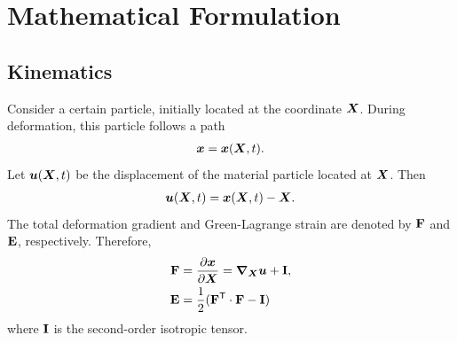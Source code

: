 
\chapter{Mathematical Formulation}

\section{Kinematics}
Consider a certain particle, initially located at the coordinate ${\bm{X}}$. During deformation, this particle follows a path 
\begin{gather}
{\bm{x}} = {\bm{x}}({\bm{X}},t).
\end{gather}
Let ${\bm{u}}({\bm{X}}, t)$ be the displacement of the material particle located at ${\bm{X}}$. Then
\begin{gather}
     {\bm{u}}({\bm{X}}, t) = {\bm{x}}({\bm{X}}, t) - {\bm{X}}.
\end{gather}
The total deformation gradient and Green-Lagrange strain are denoted by $\mathbf{F}$ and $\mathbf{E}$, respectively. Therefore, 
\begin{align}
    \mathbf{F} &= \frac{\partial {\bm{x}}}{\partial {\bm{X}}} = \bm{\nabla}_{\bm{X}} {\bm{u}} + \mathbf{I}, \\
    \mathbf{E} &= \frac{1}{2}(\mathbf{F}^{\sf {T}} \cdot \mathbf{F} - \mathbf{I})
\end{align}
where $\mathbf{I}$ is the second-order isotropic tensor.

